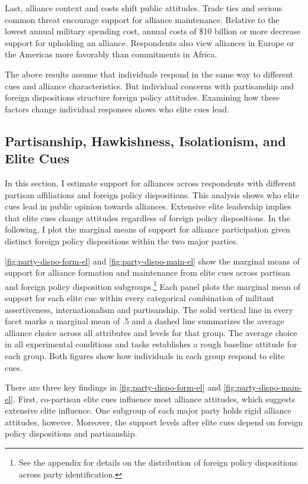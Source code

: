 \documentclass[12pt]{article}
\begin{document}
Last, alliance context and costs shift public attitudes. 
Trade ties and serious common threat encourage support for alliance maintenance. 
Relative to the lowest annual military spending cost, annual costs of \$10 billion or more decrease support for upholding an alliance.  
Respondents also view alliances in Europe or the Americas more favorably than commitments in Africa. 


The above results assume that individuals respond in the same way to different cues and alliance characteristics. 
But individual concerns with partisanship and foreign dispositions structure foreign policy attitudes.
Examining how these factors change individual responses shows who elite cues lead.  



\subsection{Partisanship, Hawkishness, Isolationism, and Elite Cues}



In this section, I estimate support for alliances across respondents with different partisan affiliations and foreign policy dispositions.  
This analysis shows who elite cues lead in public opinion towards alliances. 
Extensive elite leadership implies that elite cues change attitudes regardless of foreign policy dispositions. 
In the following, I plot the marginal means of support for alliance participation given distinct foreign policy dispositions within the two major parties.  


\autoref{fig:party-dispo-form-el} and \autoref{fig:party-dispo-main-el} show the marginal means of support for alliance formation and maintenance from elite cues across partisan and foreign policy disposition subgroups.\footnote{See the appendix for details on the distribution of foreign policy dispositions across party identification.} 
Each panel plots the marginal mean of support for each elite cue within every categorical combination of militant assertiveness, internationalism and partisanship.
The solid vertical line in every facet marks a marginal mean of .5 and a dashed line summarizes the average alliance choice across all attributes and levels for that group.
The average choice in all experimental conditions and tasks establishes a rough baseline attitude for each group.  
Both figures show how individuals in each group respond to elite cues. 


There are three key findings in \autoref{fig:party-dispo-form-el} and \autoref{fig:party-dispo-main-el}. 
First, co-partisan elite cues influence most alliance attitudes, which suggests extensive elite influence. 
One subgroup of each major party holds rigid alliance attitudes, however. 
Moreover, the support levels after elite cues depend on foreign policy dispositions and partisanship. 
\end{document}
